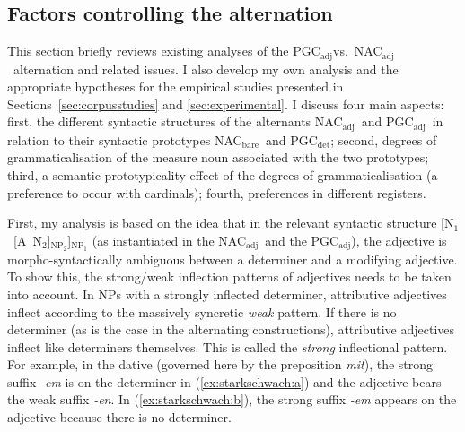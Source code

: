 \documentclass[USenglish]{article}
\newcommand{\Sub}[1]{\ensuremath{\mathrm{_{#1}}}}
\newcommand{\NACb}{NAC\Sub{bare}}
\newcommand{\NACa}{NAC\Sub{adj}}
\newcommand{\PGCd}{PGC\Sub{det}}
\newcommand{\PGCa}{PGC\Sub{adj}}
\begin{document}
\subsection{Factors controlling the alternation}
\label{sec:analyses}

This section briefly reviews existing analyses of the \PGCa vs.\ \NACa\ alternation and related issues.
I also develop my own analysis and the appropriate hypotheses for the empirical studies presented in Sections~\ref{sec:corpusstudies} and \ref{sec:experimental}.
I discuss four main aspects:
first, the different syntactic structures of the alternants \NACa\ and \PGCa\ in relation to their syntactic prototypes \NACb\ and \PGCd;
second, degrees of grammaticalisation of the measure noun associated with the two prototypes;
third, a semantic prototypicality effect of the degrees of grammaticalisation (a preference to occur with cardinals);
fourth, preferences in different registers.


First, my analysis is based on the idea that in the relevant syntactic structure [N\Sub{1}~[A~N\Sub{2}]\Sub{NP\Sub{2}}]\Sub{NP\Sub{1}} (as instantiated in the \NACa\ and the \PGCa), the adjective is morpho-syntactically ambiguous between a determiner and a modifying adjective.
To show this, %
the strong\slash weak inflection patterns of adjectives needs to be taken into account.
In NPs with a strongly inflected determiner, attributive adjectives inflect according to the massively syncretic \textit{weak} pattern.
If there is no determiner (as is the case in the alternating constructions), attributive adjectives inflect like determiners themselves.
This is called the \textit{strong} inflectional pattern.
For example, in the dative (governed here by the preposition \textit{mit}), the strong suffix \textit{-em} is on the determiner in (\ref{ex:starkschwach:a}) and the adjective bears the weak suffix \textit{-en}. 
In (\ref{ex:starkschwach:b}), the strong suffix \textit{-em} appears on the adjective because there is no determiner.
\end{document}
